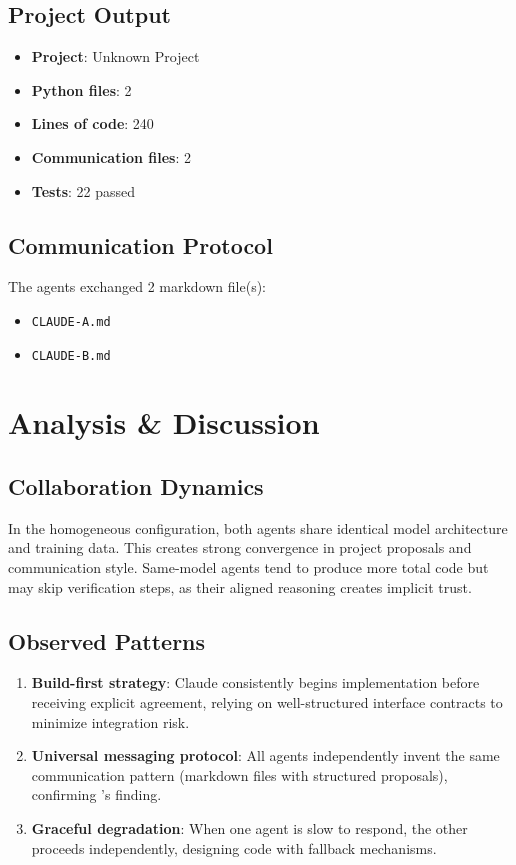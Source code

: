 \documentclass[11pt,a4paper]{article}
\begin{document}
\subsection{Project Output}

\begin{itemize}
  \item \textbf{Project}: Unknown Project
  \item \textbf{Python files}: 2
  \item \textbf{Lines of code}: 240
  \item \textbf{Communication files}: 2
  \item \textbf{Tests}: 22 passed
\end{itemize}

\subsection{Communication Protocol}

The agents exchanged 2 markdown file(s):
\begin{itemize}
  \item \texttt{CLAUDE-A.md}
  \item \texttt{CLAUDE-B.md}
\end{itemize}

\section{Analysis \& Discussion}

\subsection{Collaboration Dynamics}

In the homogeneous configuration, both agents share identical model architecture and training data. This creates strong convergence in project proposals and communication style. Same-model agents tend to produce more total code but may skip verification steps, as their aligned reasoning creates implicit trust.

\subsection{Observed Patterns}

\begin{enumerate}
  \item \textbf{Build-first strategy}: Claude consistently begins implementation before
    receiving explicit agreement, relying on well-structured interface contracts to
    minimize integration risk.
  \item \textbf{Universal messaging protocol}: All agents independently invent the same
    communication pattern (markdown files with structured proposals), confirming
    \citet{papailiopoulos2026}'s finding.
  \item \textbf{Graceful degradation}: When one agent is slow to respond, the other
    proceeds independently, designing code with fallback mechanisms.
\end{enumerate}
\end{document}
